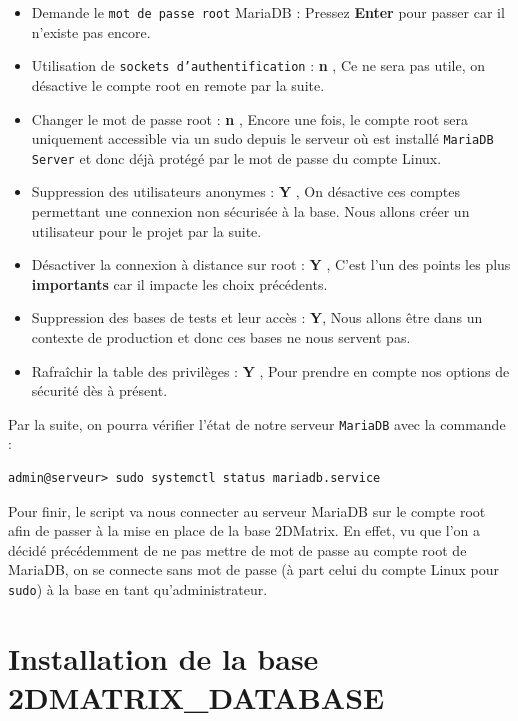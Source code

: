 \begin{itemize}
    \item Demande le \texttt{mot de passe root} MariaDB : Pressez \textbf{Enter} pour passer car il n'existe pas encore.
    \item Utilisation de \texttt{sockets d'authentification} : \color{red}\textbf{n}  \color{black}, Ce ne sera pas utile, on désactive le compte root en remote par la suite.
    \item Changer le mot de passe root : \color{red}\textbf{n} \color{black}, Encore une fois, le compte root sera uniquement accessible via un sudo depuis le serveur où est installé \texttt{MariaDB Server} et donc déjà protégé par le mot de passe du compte Linux.
    \item Suppression des utilisateurs anonymes : \color{green}\textbf{Y} \color{black}, On désactive ces comptes permettant une connexion non sécurisée à la base. Nous allons créer un utilisateur pour le projet par la suite.
    \item Désactiver la connexion à distance sur root : \color{green}\textbf{Y} \color{black}, C'est l'un des points les plus \textbf{importants} car il impacte les choix précédents.
    \item Suppression des bases de tests et leur accès : \color{green}\textbf{Y}\color{black}, Nous allons être dans un contexte de production et donc ces bases ne nous servent pas.
    \item Rafraîchir la table des privilèges : \color{green}\textbf{Y} \color{black}, Pour prendre en compte nos options de sécurité dès à présent.
\end{itemize}
Par la suite, on pourra vérifier l'état de notre serveur \texttt{MariaDB} avec la commande :
\begin{verbatim}
admin@serveur> sudo systemctl status mariadb.service
\end{verbatim}
 Pour finir, le script va nous connecter au serveur MariaDB sur le compte root afin de passer à la mise en place de la base 2DMatrix. En effet, vu que l'on a décidé précédemment de ne pas mettre de mot de passe au compte root de MariaDB, on se connecte sans mot de passe (à part celui du compte Linux pour \texttt{sudo}) à la base en tant qu'administrateur.
 
 \section{Installation de la base 2DMATRIX\_DATABASE}
